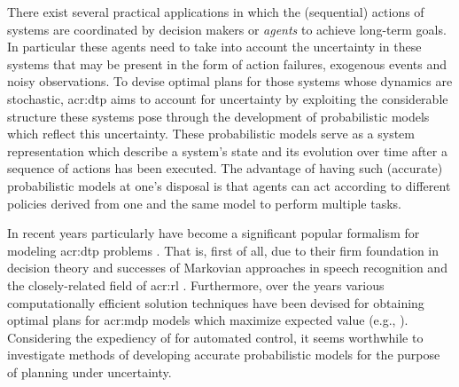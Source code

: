 There exist several practical applications in which the (sequential) actions of systems are coordinated by decision makers or \textit{agents} to achieve long-term goals.
In particular these agents need to take into account the uncertainty in these systems that may be present in the form of action failures, exogenous events and noisy observations.
To devise optimal plans for those systems whose dynamics are stochastic, \acrfull{acr:dtp} aims to account for uncertainty by exploiting the considerable structure these systems pose through the development of probabilistic models which reflect this uncertainty.
These probabilistic models serve as a system representation which describe a system's state and its evolution over time after a sequence of actions has been executed.
The advantage of having such (accurate) probabilistic models at one's disposal is that agents can act according to different policies derived from one and the same model to perform multiple tasks.

In recent years particularly  have become a significant popular formalism for modeling \acrshort{acr:dtp} problems \cite{Boutilier1999}. 
That is, first of all, due to their firm foundation in decision theory and successes of Markovian approaches in speech recognition \cite{baker1992large, gales2008application, rabiner1989tutorial} and the closely-related field of \acrfull{acr:rl} \cite{kaelbling1996reinforcement, Brafman2002}.
Furthermore, over the years various computationally efficient solution techniques have been devised for obtaining optimal plans for \acrshort{acr:mdp} models which maximize expected value (e.g.,  \cite{puterman2014markov, howard1960dynamic}).
Considering the expediency of  for automated control, it seems worthwhile to investigate methods of developing accurate probabilistic models for the purpose of planning under uncertainty.



